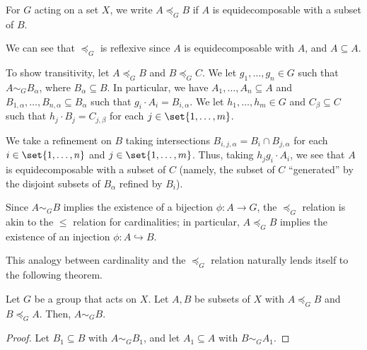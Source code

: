 \documentclass[10pt]{mypackage}
\begin{document}
\begin{definition}
  For $G$ acting on a set $X$, we write $A\preceq_{G}B$ if $A$ is equidecomposable with a subset of $B$.
\end{definition}
\begin{remark}
  We can see that $\preceq_{G}$ is reflexive since $A$ is equidecomposable with $A$, and $A\subseteq A$.\newline

  To show transitivity, let $A\preceq_{G} B$ and $B\preceq_{G} C$. We let $g_1,\dots,g_n\in G$ such that $A\sim_{G}B_{\alpha}$, where $B_{\alpha}\subseteq B$. In particular, we have $A_1,\dots,A_n\subseteq A$ and $B_{1,\alpha},\dots,B_{n,\alpha}\subseteq B_{\alpha}$ such that $g_i\cdot A_i = B_{i,\alpha}$. We let $h_1,\dots,h_m\in G$ and $C_{\beta}\subseteq C$ such that $h_j\cdot B_j = C_{j,\beta}$ for each $j\in \set{1,\dots,m}$.\newline

  We take a refinement on $B$ taking intersections $B_{i,j,\alpha} = B_i \cap B_{j,\alpha}$ for each $i\in \set{1,\dots,n}$ and $j\in \set{1,\dots,m}$. Thus, taking $h_jg_i\cdot A_i$, we see that $A$ is equidecomposable with a subset of $C$ (namely, the subset of $C$ ``generated'' by the disjoint subsets of $B_{\alpha}$ refined by $B_i$).
\end{remark}
\begin{remark}
  Since $A\sim_{G} B$ implies the existence of a bijection $\phi: A\rightarrow G$, the $\preceq_{G}$ relation is akin to the $\leq$ relation for cardinalities; in particular, $A\preceq_{G}B$ implies the existence of an injection $\phi: A\hookrightarrow B$.\newline

  This analogy between cardinality and the $\preceq_{G}$ relation naturally lends itself to the following theorem.
\end{remark}
\begin{theorem}
  Let $G$ be a group that acts on $X$. Let $A,B$ be subsets of $X$ with $A\preceq_{G} B$ and $B\preceq_{G} A$. Then, $A\sim_{G} B$.
\end{theorem}
\begin{proof}
  Let $B_1\subseteq B$ with $A\sim_{G} B_1$, and let $A_1\subseteq A$ with $B\sim_{G} A_1$.
\end{proof}
\end{document}
